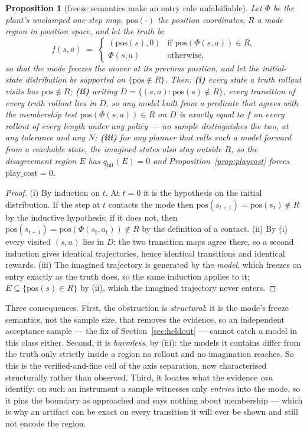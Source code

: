 \documentclass[11pt]{article}
\newtheorem{proposition}{Proposition}
\theoremstyle{definition}
\theoremstyle{remark}
\begin{document}
\begin{proposition}[freeze semantics make an entry rule unfalsifiable]
\label{prop:entryclass}
Let $\Phi$ be the plant's unclamped one-step map, $\mathrm{pos}(\cdot)$ the position coordinates, $R$ a mode region in position space, and let the truth be
\[
  f(s,a) \;=\;
  \begin{cases}
    (\mathrm{pos}(s), 0) & \text{if } \mathrm{pos}(\Phi(s,a)) \in R,\\
    \Phi(s,a) & \text{otherwise,}
  \end{cases}
\]
so that the mode freezes the mover at its \emph{previous} position, and let the initial-state distribution be supported on $\{\mathrm{pos} \notin R\}$. Then:
\textbf{(i)} every state a truth rollout visits has $\mathrm{pos} \notin R$;
\textbf{(ii)} writing $D = \{(s,a) : \mathrm{pos}(s) \notin R\}$, every transition of every truth rollout lies in $D$, so any model built from a predicate that agrees with the membership test $\mathrm{pos}(\Phi(s,a)) \in R$ on $D$ is \emph{exactly} equal to $f$ on every rollout of every length under any policy --- no sample distinguishes the two, at any tolerance and any $N$;
\textbf{(iii)} for any planner that rolls such a model forward from a reachable state, the imagined states also stay outside $R$, so the disagreement region $E$ has $q_{\mathrm{hit}}(E) = 0$ and Proposition~\ref{prop:playcost} forces $\mathrm{play\_cost} = 0$.
\end{proposition}

\begin{proof}
(i) By induction on $t$. At $t = 0$ it is the hypothesis on the initial distribution. If the step at $t$ contacts the mode then $\mathrm{pos}(s_{t+1}) = \mathrm{pos}(s_t) \notin R$ by the inductive hypothesis; if it does not, then $\mathrm{pos}(s_{t+1}) = \mathrm{pos}(\Phi(s_t,a_t)) \notin R$ by the definition of a contact. (ii) By (i) every visited $(s,a)$ lies in $D$; the two transition maps agree there, so a second induction gives identical trajectories, hence identical transitions and identical rewards. (iii) The imagined trajectory is generated by the \emph{model}, which freezes on entry exactly as the truth does, so the same induction applies to it; $E \subseteq \{\mathrm{pos}(s) \in R\}$ by (ii), which the imagined trajectory never enters.
\end{proof}

Three consequences. First, the obstruction is \emph{structural}: it is the mode's freeze semantics, not the sample size, that removes the evidence, so an independent acceptance sample --- the fix of Section~\ref{sec:heldout} --- cannot catch a model in this class either. Second, it is \emph{harmless}, by (iii): the models it contains differ from the truth only strictly inside a region no rollout and no imagination reaches. So this is the verified-and-fine cell of the axis separation, now characterised structurally rather than observed. Third, it locates what the evidence \emph{can} identify: on such an instrument a sample witnesses only \emph{entries} into the mode, so it pins the boundary as approached and says nothing about membership --- which is why an artifact can be exact on every transition it will ever be shown and still not encode the region.
\end{document}
